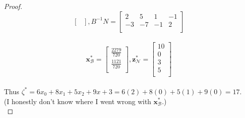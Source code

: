 \documentclass[12pt,oneside]{amsart}
\numberwithin{equation}{section}
\numberwithin{figure}{section}
\theoremstyle{plain}
\theoremstyle{definition}
\begin{document}
\begin{proof}
\[\begin{bmatrix}
\end{bmatrix}, B^{-1}N = \begin{bmatrix}
  2  & 5  & 1  & -1 \\
  -3 & -7 & -1 & 2  \\
\end{bmatrix}\] \\
\[\mathbf{x}^*_{\mathscr{B}} = \begin{bmatrix}
  \frac{2279}{720} \\
  \frac{1121}{720} \\
\end{bmatrix},\mathbf{z}^*_{\mathscr{N}} = \begin{bmatrix}
  10 \\
  0  \\
  3  \\
  5  \\
\end{bmatrix}\] \\
Thus $\zeta^* = 6x_0 + 8x_1 + 5x_2 + 9x+3 = 6(2) + 8(0) + 5(1) + 9(0) = 17$. \\ 
(I honestly don't know where I went wrong with $\mathbf{x}^*_{\mathscr{B}}$.) \\
\end{proof}
\end{document}

